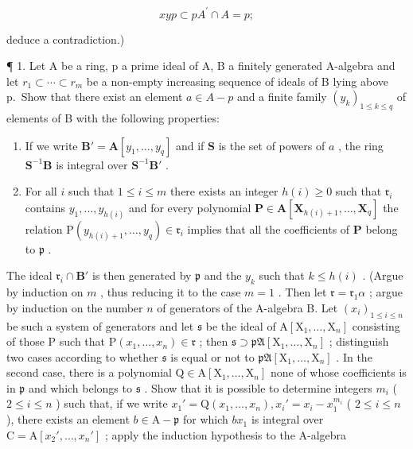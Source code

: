 \[
x y p \subset p A ^ {\prime} \cap A = p;
\]

deduce a contradiction.)


¶ 1. Let A be a ring, p a prime ideal of A, B a finitely generated A-algebra and let \(r_{1} \subset \cdots \subset r_{m}\) be a non-empty increasing sequence of ideals of B lying above p.~Show that there exist an element \(a \in A - p\) and a finite family \((y_{k})_{1 \leqslant k \leqslant q}\) of elements of B with the following properties:

\begin{enumerate}
\def\labelenumi{(\arabic{enumi})}
\item
  If we write \(\mathbf{B}' = \mathbf{A}[y_1, \ldots, y_q]\) and if \(\mathbf{S}\) is the set of powers of \(a\) , the ring \(\mathbf{S}^{-1}\mathbf{B}\) is integral over \(\mathbf{S}^{-1}\mathbf{B}'\) .
\item
  For all \(i\) such that \(1 \leqslant i \leqslant m\) there exists an integer \(h(i) \geqslant 0\) such that \(\mathfrak{r}_i\) contains \(y_1, \ldots, y_{h(i)}\) and for every polynomial \(\mathbf{P} \in \mathbf{A}[\mathbf{X}_{h(i)+1}, \ldots, \mathbf{X}_q]\) the relation \(\mathrm{P}(y_{h(i)+1}, \ldots, y_q) \in \mathfrak{r}_i\) implies that all the coefficients of \(\mathbf{P}\) belong to \(\mathfrak{p}\) .
\end{enumerate}

The ideal \(\mathfrak{r}_i\cap \mathbf{B}'\) is then generated by \(\mathfrak{p}\) and the \(y_{k}\) such that \(k\leqslant h(i)\) . (Argue by induction on \(m\) , thus reducing it to the case \(m = 1\) . Then let \(\mathfrak{r} = \mathfrak{r}_1\alpha\) ; argue by induction on the number \(n\) of generators of the A-algebra B. Let \((x_{i})_{1\leqslant i\leqslant n}\) be such a system of generators and let \(\mathfrak{s}\) be the ideal of \(\mathrm{A}[\mathrm{X}_1,\dots ,\mathrm{X}_n]\) consisting of those P such that \(\mathrm{P}(x_1,\ldots ,x_n)\in \mathfrak{r}\) ; then \(\mathfrak{s}\supset \mathfrak{pA}[\mathrm{X}_1,\ldots ,\mathrm{X}_n]\) ; distinguish two cases according to whether \(\mathfrak{s}\) is equal or not to \(\mathfrak{pA}[\mathrm{X}_1,\ldots ,\mathrm{X}_n]\) . In the second case, there is a polynomial \(\mathrm{Q}\in \mathrm{A}[\mathrm{X}_1,\ldots ,\mathrm{X}_n]\) none of whose coefficients is in \(\mathfrak{p}\) and which belongs to \(\mathfrak{s}\) . Show that it is possible to determine integers \(m_i\) ( \(2\leqslant i\leqslant n\) ) such that, if we write \(x_1' = \mathrm{Q}(x_1,\ldots ,x_n),x_i' = x_i - x_1^{m_i}\) ( \(2\leqslant i\leqslant n\) ), there exists an element \(b\in \mathrm{A} - \mathfrak{p}\) for which \(bx_{1}\) is integral over \(\mathrm{C} = \mathrm{A}[x_2',\ldots ,x_n']\) ; apply the induction hypothesis to the A-algebra

